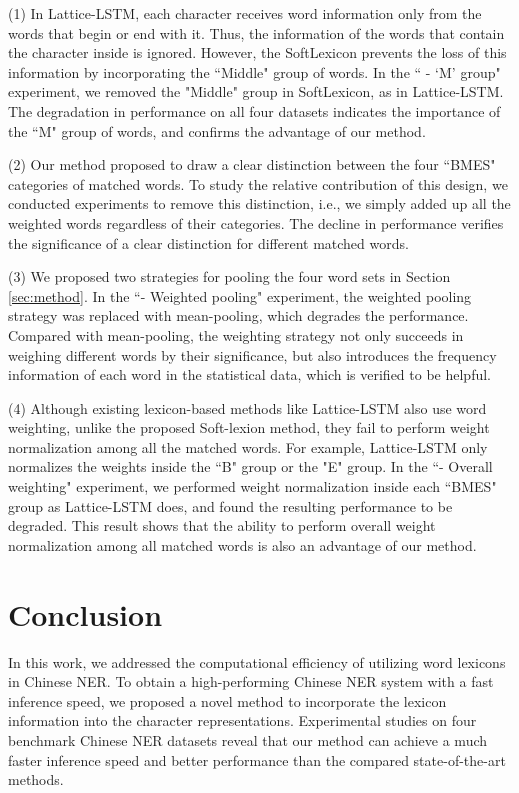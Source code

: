 \documentclass[11pt,a4paper]{article}
\begin{document}
\begin{CJK}{UTF8}{gbsn}
(1) In Lattice-LSTM, each character receives word information only from the words that begin or end with it. Thus, the information of the words that contain the character inside is ignored. However, the SoftLexicon prevents the loss of this information by incorporating the ``Middle" group of words. In the `` - `M' group" experiment, we removed
the "Middle" group in SoftLexicon, as in Lattice-LSTM. The degradation in performance on all four datasets indicates the importance of the ``M" group of words, and confirms the advantage of our method.


(2) Our method proposed to draw a clear distinction between the four ``BMES" categories of matched words. To study the relative contribution of this design, we conducted experiments to remove this distinction, i.e., we simply added up all the weighted words regardless of their categories. The decline in performance verifies the significance of a clear distinction for different matched words. 

(3) We proposed two strategies for pooling the four word sets in Section \ref{sec:method}. In the ``- Weighted pooling" experiment, the weighted pooling strategy was replaced with mean-pooling, which degrades the performance. Compared with mean-pooling,
the weighting strategy not only succeeds in weighing different words by their significance, but also introduces the frequency information of each word in the statistical data, which is verified to be helpful.

(4) 
Although existing lexicon-based methods like Lattice-LSTM also use word weighting, unlike the proposed Soft-lexion method, they fail to perform weight normalization among all the matched words. For example, Lattice-LSTM only normalizes the weights inside the ``B" group or the "E" group. In the ``- Overall weighting" experiment, we performed weight normalization inside each ``BMES" group as Lattice-LSTM does, and found the resulting performance to be degraded. This result shows that the ability to perform overall weight normalization among all matched words is also an advantage of our method. 








\section{Conclusion}
In this work, we addressed the computational efficiency of utilizing word lexicons in Chinese NER. To obtain a high-performing Chinese NER system with a fast inference speed, we proposed a novel method to incorporate the lexicon information into the character representations. Experimental studies on four benchmark Chinese NER datasets reveal that our method can achieve a much faster inference speed and better performance than the compared state-of-the-art methods. 


\end{CJK}
\end{document}
